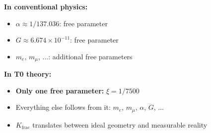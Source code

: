 	\textbf{In conventional physics:}
	\begin{itemize}
		\item $\alpha \approx 1/137.036$: free parameter
		\item $G \approx 6.674\times10^{-11}$: free parameter  
		\item $m_e$, $m_μ$, ...: additional free parameters
	\end{itemize}
	
	\textbf{In T0 theory:}
	\begin{itemize}
		\item \textbf{Only one free parameter:} $\xi = 1/7500$
		\item Everything else follows from it: $m_e$, $m_μ$, $\alpha$, $G$, ...
		\item $K_{\text{frac}}$ translates between ideal geometry and measurable reality
	\end{itemize}
	